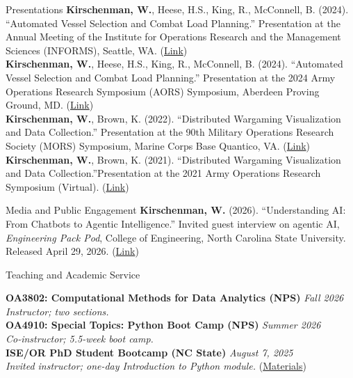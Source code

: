 \documentclass[
	11pt,
]{resume}
\begin{document}
\begin{rSection}{Presentations}
    \textbf{Kirschenman, W.}, Heese, H.S., King, R., McConnell, B. (2024). ``Automated Vessel Selection and Combat Load Planning.'' Presentation at the Annual Meeting of the Institute for Operations Research and the Management Sciences (INFORMS), Seattle, WA. (\href{https://willk30.github.io/documents/Kirschenman_INFORMS_Slides.pptx}{Link}) \medskip \\
    \textbf{Kirschenman, W.}, Heese, H.S., King, R., McConnell, B. (2024). ``Automated Vessel Selection and Combat Load Planning.'' Presentation at the 2024 Army Operations Research Symposium (AORS) Symposium, Aberdeen Proving Ground, MD. (\href{https://willk30.github.io/documents/Kirschenman_AORS_Slides_Submission.pptx}{Link}) \medskip \\
    \textbf{Kirschenman, W.}, Brown, K. (2022). ``Distributed Wargaming Visualization and Data Collection.'' Presentation at the 90th Military Operations Research Society (MORS) Symposium, Marine Corps Base Quantico, VA. (\href{https://willk30.github.io/documents/17295.1.pdf}{Link}) \medskip \\
    \textbf{Kirschenman, W.}, Brown, K. (2021). ``Distributed Wargaming Visualization and Data Collection.''Presentation at the 2021 Army Operations Research Symposium (Virtual). (\href{https://willk30.github.io/documents/17295.1.pdf}{Link})
\end{rSection}

\begin{rSection}{Media and Public Engagement}
    \textbf{Kirschenman, W.} (2026). ``Understanding AI: From Chatbots to Agentic Intelligence.'' Invited guest interview on agentic AI, \textit{Engineering Pack Pod}, College of Engineering, North Carolina State University. Released April 29, 2026. (\href{https://open.spotify.com/show/3lTIn37UWFNgCzLOB68Wcn}{Link})
\end{rSection}

\begin{rSection}{Teaching and Academic Service}

\textbf{OA3802: Computational Methods for Data Analytics (NPS)} \hfill \textit{Fall 2026} \\
\textit{Instructor; two sections.} \medskip \\
\textbf{OA4910: Special Topics: Python Boot Camp (NPS)} \hfill \textit{Summer 2026} \\
\textit{Co-instructor; 5.5-week boot camp.} \medskip \\
\textbf{ISE/OR PhD Student Bootcamp (NC State)} \hfill \textit{August 7, 2025} \\
\textit{Invited instructor; one-day Introduction to Python module.} (\href{https://github.com/willk30/python-bootcamp-student}{Materials})
\end{rSection}
\end{document}
